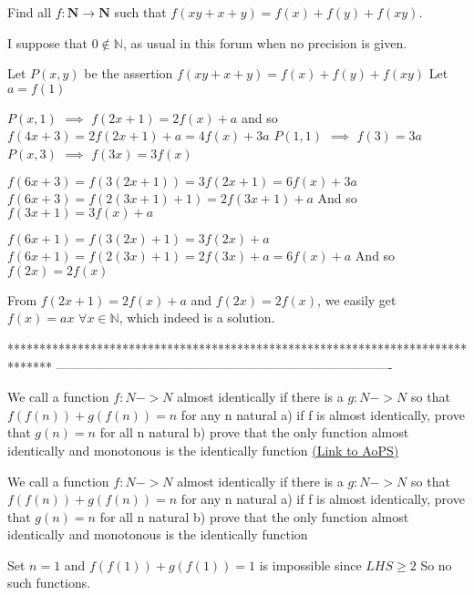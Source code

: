 \begin{solution}
	\begin{tcolorbox}Find all $f:\mathbf{N} \rightarrow \mathbf{N} $ such that
$f(xy+x+y)=f(x)+f(y)+f(xy).$\end{tcolorbox}
I suppose that $0\notin\mathbb N$, as usual in this forum when no precision is given.

Let $P(x,y)$ be the assertion $f(xy+x+y)=f(x)+f(y)+f(xy)$
Let $a=f(1)$

$P(x,1)$ $\implies$ $f(2x+1)=2f(x)+a$ and so $f(4x+3)=2f(2x+1)+a=4f(x)+3a$
$P(1,1)$ $\implies$ $f(3)=3a$
$P(x,3)$ $\implies$ $f(3x)=3f(x)$

$f(6x+3)=f(3(2x+1))=3f(2x+1)=6f(x)+3a$
$f(6x+3)=f(2(3x+1)+1)=2f(3x+1)+a$
And so $f(3x+1)=3f(x)+a$

$f(6x+1)=f(3(2x)+1)=3f(2x)+a$
$f(6x+1)=f(2(3x)+1)=2f(3x)+a=6f(x)+a$
And so $f(2x)=2f(x)$

From $f(2x+1)=2f(x)+a$ and $f(2x)=2f(x)$, we easily get $\boxed{f(x)=ax}$ $\forall x\in \mathbb N$, which indeed is a solution.
\end{solution}
*******************************************************************************
-------------------------------------------------------------------------------

\begin{problem}
	We call a function $ f:N->N $ almost identically if there is a $ g:N->N $ 
so that $ f(f(n))+g(f(n))=n $ for any n natural
a) if f is almost identically, prove that $ g(n)=n $ for all n natural
b) prove that the only function almost identically and monotonous is the identically function
	\flushright \href{https://artofproblemsolving.com/community/c6h582162}{(Link to AoPS)}
\end{problem}



\begin{solution}
	\begin{tcolorbox}We call a function $ f:N->N $ almost identically if there is a $ g:N->N $ 
so that $ f(f(n))+g(f(n))=n $ for any n natural
a) if f is almost identically, prove that $ g(n)=n $ for all n natural
b) prove that the only function almost identically and monotonous is the identically function\end{tcolorbox}
Set $n=1$ and $ f(f(1))+g(f(1))=1 $  is impossible since $LHS\ge 2$
So no such functions.
\end{solution}



